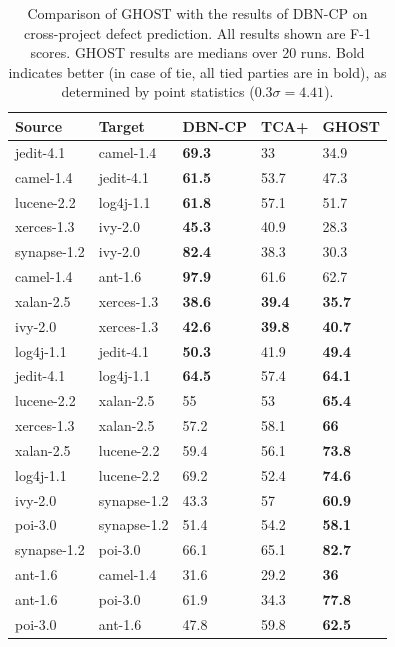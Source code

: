 \documentclass[10pt,compsoc,twocolumn]{IEEEtran}
\begin{document}
\begin{table}[ht!]
    \centering
    \caption{Comparison of GHOST with the results of DBN-CP \cite{wang2016automatically} on cross-project defect prediction. All results shown are F-1 scores. GHOST results are medians over 20 runs. Bold indicates better (in case of tie, all tied parties are in bold), as determined by point statistics ($0.3 \sigma = 4.41$).}
    \label{tab:tan}
    \begin{tabular}{ ll|lll }
    \toprule
	\textbf{Source} & \textbf{Target} & \textbf{DBN-CP} & \textbf{TCA+} & \textbf{GHOST} \\
	\midrule
	jedit-4.1 & camel-1.4 & \cellcolor{blue!10}\textbf{69.3} & 33 & 34.9 \\ 
	camel-1.4 & jedit-4.1 & \cellcolor{blue!10}\textbf{61.5} & 53.7 & 47.3 \\ 
	lucene-2.2 & log4j-1.1 & \cellcolor{blue!10}\textbf{61.8} & 57.1 & 51.7 \\ 
	xerces-1.3 & ivy-2.0 & \cellcolor{blue!10}\textbf{45.3} & 40.9 & 28.3 \\ 
	synapse-1.2 & ivy-2.0 & \cellcolor{blue!10}\textbf{82.4} & 38.3 & 30.3 \\
	camel-1.4 & ant-1.6 & \cellcolor{blue!10}\textbf{97.9} & 61.6 & 62.7 \\
	xalan-2.5 & xerces-1.3 & \cellcolor{blue!10}\textbf{38.6} & \cellcolor{blue!10}\textbf{39.4} & \cellcolor{blue!10}\textbf{35.7} \\ 
	ivy-2.0 & xerces-1.3 & \cellcolor{blue!10}\textbf{42.6} & \cellcolor{blue!10}\textbf{39.8} & \cellcolor{blue!10}\textbf{40.7} \\ 
	log4j-1.1 & jedit-4.1 & \cellcolor{blue!10}\textbf{50.3} & 41.9 & \cellcolor{blue!10}\textbf{49.4} \\ 
	jedit-4.1 & log4j-1.1 & \cellcolor{blue!10}\textbf{64.5} & 57.4 & \cellcolor{blue!10}\textbf{64.1} \\
	lucene-2.2 & xalan-2.5 & 55 & 53 & \cellcolor{blue!10}\textbf{65.4} \\ 
	xerces-1.3 & xalan-2.5 & 57.2 & 58.1 & \cellcolor{blue!10}\textbf{66} \\ 
	xalan-2.5 & lucene-2.2 & 59.4 & 56.1 & \cellcolor{blue!10}\textbf{73.8} \\ 
	log4j-1.1 & lucene-2.2 & 69.2 & 52.4 & \cellcolor{blue!10}\textbf{74.6} \\ 

	ivy-2.0 & synapse-1.2 & 43.3 & 57 & \cellcolor{blue!10}\textbf{60.9} \\ 
	poi-3.0 & synapse-1.2 & 51.4 & 54.2 & \cellcolor{blue!10}\textbf{58.1} \\ 
	synapse-1.2 & poi-3.0 & 66.1 & 65.1 & \cellcolor{blue!10}\textbf{82.7} \\ 
	ant-1.6 & camel-1.4 & 31.6 & 29.2 & \cellcolor{blue!10}\textbf{36} \\ 
	ant-1.6 & poi-3.0 & 61.9 & 34.3 & \cellcolor{blue!10}\textbf{77.8} \\ 
	poi-3.0 & ant-1.6 & 47.8 & 59.8 & \cellcolor{blue!10}\textbf{62.5} \\ 
	\bottomrule
\end{tabular}
    
\end{table}
\end{document}
